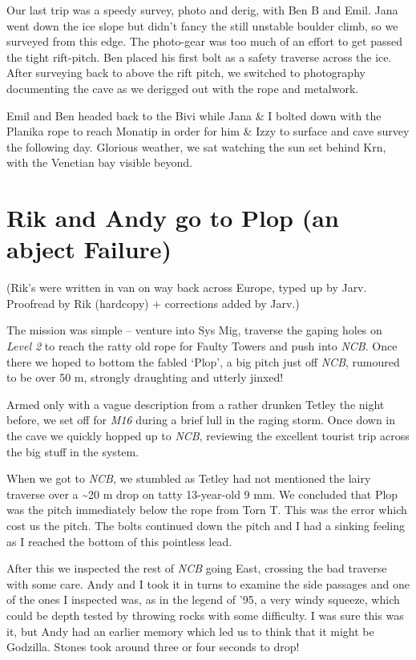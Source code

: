 Our last trip was a speedy survey, photo and derig, with Ben B and Emil.
Jana went down the ice slope but didn't fancy the still unstable boulder
climb, so we surveyed from this edge. The photo-gear was too much of an
effort to get passed the tight rift-pitch. Ben placed his first bolt as
a safety traverse across the ice. After surveying back to above the rift
pitch, we switched to photography documenting the cave as we derigged
out with the rope and metalwork.

Emil and Ben headed back to the Bivi while Jana \& I bolted down with
the Planika rope to reach Monatip in order for him \& Izzy to surface
and cave survey the following day. Glorious weather, we sat watching the
sun set behind Krn, with the Venetian bay visible beyond.


\hypertarget{rik-and-andy-go-to-plop-an-abject-failure}{%
\section{Rik and Andy go to Plop (an abject
Failure)}\label{rik-and-andy-go-to-plop-an-abject-failure}}

(Rik's were written in van on way back across Europe, typed up by Jarv.
Proofread by Rik (hardcopy) + corrections added by Jarv.)

The mission was simple -- venture into Sys Mig, traverse the gaping
holes on \emph{Level 2} to reach the ratty old rope for Faulty Towers
and push into \emph{NCB}. Once there we hoped to bottom the fabled
`Plop', a big pitch just off \emph{NCB}, rumoured to be over 50 m,
strongly draughting and utterly jinxed!

Armed only with a vague description from a rather drunken Tetley the
night before, we set off for \emph{M16} during a brief lull in the
raging storm. Once down in the cave we quickly hopped up to \emph{NCB},
reviewing the excellent tourist trip across the big stuff in the system.

When we got to \emph{NCB}, we stumbled as Tetley had not mentioned the
lairy traverse over a \textasciitilde{}20 m drop on tatty 13-year-old 9
mm. We concluded that Plop was the pitch immediately below the rope from
Torn T. This was the error which cost us the pitch. The bolts continued
down the pitch and I had a sinking feeling as I reached the bottom of
this pointless lead.

After this we inspected the rest of \emph{NCB} going East, crossing the
bad traverse with some care. Andy and I took it in turns to examine the
side passages and one of the ones I inspected was, as in the legend of
'95, a very windy squeeze, which could be depth tested by throwing rocks
with some difficulty. I was sure this was it, but Andy had an earlier
memory which led us to think that it might be Godzilla. Stones took
around three or four seconds to drop!


